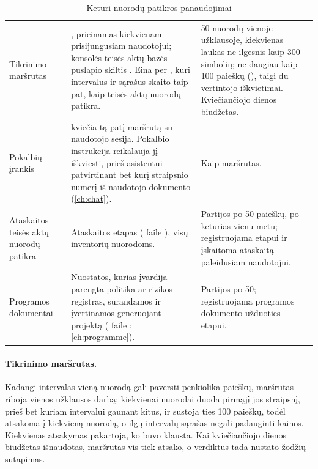 \begin{table}[H]
\caption{Keturi nuorodų patikros panaudojimai}\label{tab:company:offered}
\begin{tabularx}{\textwidth}{@{}L{29mm}YL{46mm}@{}}
\toprule
{} &  &  \\
\midrule
Tikrinimo maršrutas &
  , prieinamas kiekvienam prisijungusiam naudotojui;
  konsolės teisės aktų bazės puslapio skiltis . Eina per
  , kuri intervalus ir sąrašus skaito taip pat, kaip teisės aktų
  nuorodų patikra. &
  50 nuorodų vienoje užklausoje, kiekvienas laukas ne ilgesnis kaip 300 simbolių; ne daugiau
  kaip 100 paieškų (), taigi du vertintojo iškvietimai. Kviečiančiojo dienos
  biudžetas. \\
Pokalbių įrankis &
   kviečia tą patį maršrutą su naudotojo sesija. Pokalbio instrukcija
  reikalauja jį iškviesti, prieš asistentui patvirtinant bet kurį straipsnio numerį iš naudotojo dokumento
  (\cref{ch:chat}). &
  Kaip maršrutas. \\
Ataskaitos teisės aktų nuorodų patikra &
  Ataskaitos etapas  ( faile
  ), visų inventorių nuorodoms. &
  Partijos po 50 paieškų, po keturias vienu metu; registruojama etapui ir įskaitoma ataskaitą
  paleidusiam naudotojui. \\
Programos dokumentai &
  Nuostatos, kurias įvardija parengta politika ar rizikos registras, surandamos ir įvertinamos
  generuojant projektą ( faile ;
  \cref{ch:programme}). &
  Partijos po 50; registruojama programos dokumento užduoties etapui. \\
\bottomrule
\end{tabularx}
\end{table}

\paragraph{Tikrinimo maršrutas.} Kadangi intervalas vieną nuorodą gali paversti penkiolika
paieškų, maršrutas riboja vienos užklausos darbą:  kiekvienai nuorodai
duoda pirmąjį jos straipsnį, prieš bet kuriam intervalui gaunant kitus, ir sustoja ties 100
paieškų, todėl atsakoma į kiekvieną nuorodą, o ilgų intervalų sąrašas negali padauginti kainos.
Kiekvienas atsakymas pakartoja, ko buvo klausta. Kai kviečiančiojo dienos biudžetas išnaudotas,
maršrutas vis tiek atsako, o verdiktus tada nustato žodžių sutapimas.

